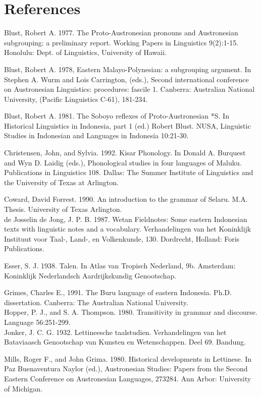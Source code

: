 \documentclass[10pt]{article}
\begin{document}
\section*{References}
Blust, Robert A. 1977. The Proto-Austronesian pronouns and Austronesian subgrouping: a preliminary report. Working Papers in Linguistics 9(2):1-15. Honolulu: Dept. of Linguistics, University of Hawaii.

Blust, Robert A. 1978, Eastern Malayo-Polynesian: a subgrouping argument. In Stephen A. Wurm and Lois Carrington, (eds.), Second international conference on Austronesian Linguistics: procedures: fascile 1. Canberra: Australian National University, (Pacific Linguistics C-61), 181-234.

Blust, Robert A. 1981. The Soboyo reflexes of Proto-Austronesian *S. In Historical Linguistics in Indonesia, part 1 (ed.) Robert Blust. NUSA, Linguistic Studies in Indonesian and Languages in Indonesia 10:21-30.

Christensen, John, and Sylvia. 1992. Kisar Phonology. In Donald A. Burquest and Wyn D. Laidig (eds.), Phonological studies in four languages of Maluku. Publications in Linguistics 108. Dallas: The Summer Institute of Linguistics and the University of Texas at Arlington.

Coward, David Forrest. 1990. An introduction to the grammar of Selaru. M.A. Thesis. University of Texas Arlington.\\
de Josselin de Jong, J. P. B. 1987. Wetan Fieldnotes: Some eastern Indonesian texts with linguistic notes and a vocabulary. Verhandelingen van het Koninklijk Instituut voor Taal-, Land-, en Volkenkunde, 130. Dordrecht, Holland: Foris Publications.

Esser, S. J. 1938. Talen. In Atlas van Tropisch Nederland, 9b. Amsterdam: Koninklijk Nederlandsch Aardrijkskundig Genootschap.

Grimes, Charles E., 1991. The Buru language of eastern Indonesia. Ph.D. dissertation. Canberra: The Australian National University.\\
Hopper, P. J., and S. A. Thompson. 1980. Transitivity in grammar and discourse. Language 56:251-299.\\
Jonker, J. C. G. 1932. Lettineesche taalstudien. Verhandelingen van het Bataviaasch Genootschap van Kunsten en Wetenschappen. Deel 69. Bandung.

Mills, Roger F., and John Grima. 1980. Historical developments in Lettinese. In Paz Buenaventura Naylor (ed.), Austronesian Studies: Papers from the Second Eastern Conference on Austronesian Languages, 273284. Ann Arbor: University of Michigan.
\end{document}
